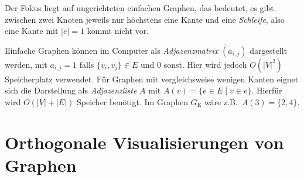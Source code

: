 \documentclass[a4paper]{scrreprt}
\theoremstyle{definition}
\begin{document}
Der Fokus liegt auf ungerichteten einfachen Graphen, das bedeutet, es gibt zwischen zwei Knoten jeweils nur höchstens eine Kante und eine \emph{Schleife}, also eine Kante mit $|e| = 1$ kommt nicht vor.

Einfache Graphen können im Computer als \emph{Adjazenzmatrix} $(a_{i,j})$ dargestellt werden, mit $a_{i,j} = 1$ falls $\{v_i, v_j\} \in E$ und $0$ sonst. Hier wird jedoch $O(|V|^2)$ Speicherplatz verwendet. Für Graphen mit vergleichsweise wenigen Kanten eignet sich die Darstellung als \emph{Adjazenzliste} $A$ mit $A(v) = \{e \in E \mid v \in e\}$. Hierfür wird $O(|V| + |E|)$ Speicher benötigt. Im Graphen $G_\text{E}$ wäre z.B.\ $A(3) = \{2,4\}$. %

\section{Orthogonale Visualisierungen von Graphen}
\label{sec:orthogonalDrawings}
\end{document}
